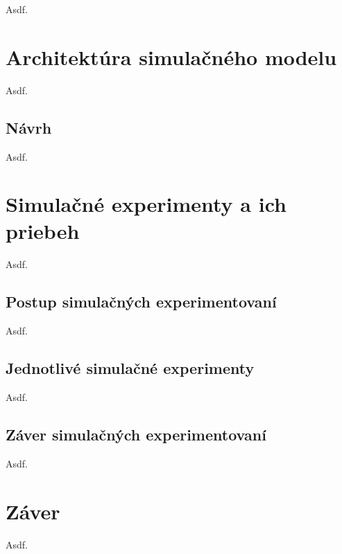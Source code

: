 \documentclass[11pt,a4paper]{article}
\begin{document}
        Asdf.


\section{Architektúra simulačného modelu}

    Asdf.

    \subsection{Návrh}

        Asdf.

\section{Simulačné experimenty a ich priebeh}

    Asdf.

    \subsection{Postup simulačných experimentovaní}

        Asdf.

    \subsection{Jednotlivé simulačné experimenty}

        Asdf.

    \subsection{Záver simulačných experimentovaní}

        Asdf.

\section{Záver}

    Asdf.



\newpage %

\makeatletter
\makeatother

\begin{flushleft}
    
\end{flushleft}
\end{document}
